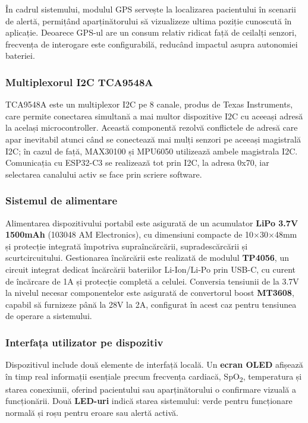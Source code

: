 \documentclass[12pt,a4paper]{article}
\newcommand{\spo}{SpO\textsubscript{2}}
\begin{document}
În cadrul sistemului, modulul GPS servește la localizarea pacientului în scenarii de alertă, permițând aparținătorului să vizualizeze ultima poziție cunoscută în aplicație. Deoarece GPS-ul are un consum relativ ridicat față de ceilalți senzori, frecvența de interogare este configurabilă, reducând impactul asupra autonomiei bateriei.

\subsubsection{Multiplexorul I2C TCA9548A}

TCA9548A este un multiplexor I2C pe 8 canale, produs de Texas Instruments, care permite conectarea simultană a mai multor dispozitive I2C cu aceeași adresă la același microcontroller. Această componentă rezolvă conflictele de adresă care apar inevitabil atunci când se conectează mai mulți senzori pe aceeași magistrală I2C; în cazul de față, MAX30100 și MPU6050 utilizează ambele magistrala I2C. Comunicația cu ESP32-C3 se realizează tot prin I2C, la adresa 0x70, iar selectarea canalului activ se face prin scriere software.

\subsubsection{Sistemul de alimentare}

Alimentarea dispozitivului portabil este asigurată de un acumulator \textbf{LiPo 3.7V 1500mAh} (103048 AM Electronics), cu dimensiuni compacte de 10$\times$30$\times$48mm și protecție integrată împotriva supraîncărcării, supradescărcării și scurtcircuitului. Gestionarea încărcării este realizată de modulul \textbf{TP4056}, un circuit integrat dedicat încărcării bateriilor Li-Ion/Li-Po prin USB-C, cu curent de încărcare de 1A și protecție completă a celulei. Conversia tensiunii de la 3.7V la nivelul necesar componentelor este asigurată de convertorul boost \textbf{MT3608}, capabil să furnizeze până la 28V la 2A, configurat în acest caz pentru tensiunea de operare a sistemului.

\subsubsection{Interfața utilizator pe dispozitiv}

Dispozitivul include două elemente de interfață locală. Un \textbf{ecran OLED} afișează în timp real informații esențiale precum frecvența cardiacă, \spo, temperatura și starea conexiunii, oferind pacientului sau aparținătorului o confirmare vizuală a funcționării. Două \textbf{LED-uri} indică starea sistemului: verde pentru funcționare normală și roșu pentru eroare sau alertă activă.
\end{document}
